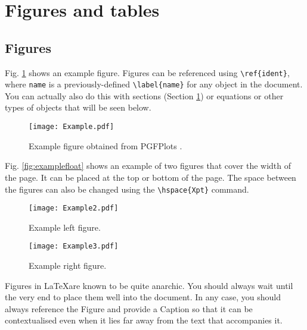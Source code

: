 \documentclass[9pt,a4paper,twoside]{tau-class/tau}
\begin{document}
\section{Figures and tables} \label{sec:table}

    \subsection{Figures}
		
	Fig. \ref{fig:figure} shows an example figure. Figures can be referenced using \verb|\ref{ident}|, where \texttt{name} is a previously-defined \verb|\label{name}| for any object in the document. You can actually also do this with sections (Section \ref{sec:table}) or equations or other types of objects that will be seen below.
		
	\begin{figure}[H]
		\centering
		\texttt{[image: Example.pdf]}
		\caption{Example figure obtained from PGFPlots \cite{PFGPlots}.}
		\label{fig:figure}
	\end{figure}
		
        Fig. \ref{fig:examplefloat} shows an example of two figures that cover the width of the page. It can be placed at the top or bottom of the page. The space between the figures can also be changed using the \verb|\hspace{Xpt}| command.
		
        \begin{figure*}[tp] %
		\centering
		  \begin{subfigure}[b]{0.38\linewidth} %
			\texttt{[image: Example2.pdf]}
			\caption{Example left figure.}
			\label{fig:figa}
		\end{subfigure}
			\hspace{20pt}   %
		\begin{subfigure}[b]{0.375\linewidth} %
			\texttt{[image: Example3.pdf]}
			\caption{Example right figure.}
			\label{fig:figb}
		\end{subfigure}
		\caption{Example figure that covers the width of the page obtained from PGFPlots \cite{PFGPlots}.}
		\label{fig:examplefloat}
	\end{figure*}

    \begin{info}
    	Figures in \LaTeX are known to be quite anarchic. You should always wait until the very end to place them well into the document. In any case, you should always reference the Figure and provide a Caption so that it can be contextualised even when it lies far away from the text that accompanies it.
    \end{info}
\end{document}
